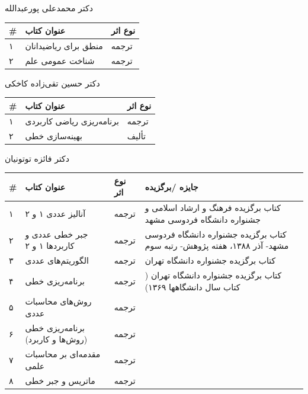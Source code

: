 \documentclass[
  letterpaper,
  DIV=11,
  numbers=noendperiod]{scrreprt}
\newcounter{none} %
\begin{document}
دکتر محمدعلی پورعبدالله

{\def\LTcaptype{none} %
\begin{longtable}[]{@{}lll@{}}
\toprule\noalign{}
\# & عنوان کتاب & نوع اثر \\
\midrule\noalign{}
\endhead
\bottomrule\noalign{}
\endlastfoot
۱ & منطق برای ریاضیدانان & ترجمه \\
۲ & شناخت عمومی علم & ترجمه \\
\end{longtable}
}

دکتر حسین تقی‌زاده کاخکی

{\def\LTcaptype{none} %
\begin{longtable}[]{@{}lll@{}}
\toprule\noalign{}
\# & عنوان کتاب & نوع اثر \\
\midrule\noalign{}
\endhead
\bottomrule\noalign{}
\endlastfoot
۱ & برنامه‌ریزی ریاضی کاربردی & ترجمه \\
۲ & بهینه‌سازی خطی & تألیف \\
\end{longtable}
}

دکتر فائزه توتونیان

{\def\LTcaptype{none} %
\begin{longtable}[]{@{}
  >{\raggedright\arraybackslash}p{}
  >{\raggedright\arraybackslash}p{}
  >{\raggedright\arraybackslash}p{}
  >{\raggedright\arraybackslash}p{}@{}}
\toprule\noalign{}
\begin{minipage}[b]{\linewidth}\raggedright
\#
\end{minipage} & \begin{minipage}[b]{\linewidth}\raggedright
عنوان کتاب
\end{minipage} & \begin{minipage}[b]{\linewidth}\raggedright
نوع اثر
\end{minipage} & \begin{minipage}[b]{\linewidth}\raggedright
جایزه /برگزیده
\end{minipage} \\
\midrule\noalign{}
\endhead
\bottomrule\noalign{}
\endlastfoot
۱ & آنالیز عددی ۱ و ۲ & ترجمه & کتاب برگزیده فرهنگ و ارشاد اسلامی و
جشنواره دانشگاه فردوسی مشهد \\
۲ & جبر خطی عددی و کاربردها ۱ و ۲ & ترجمه & کتاب برگزیده جشنواره دانشگاه
فردوسی مشهد- آذر ۱۳۸۸، هفته پژوهش- رتبه سوم \\
۳ & الگوریتم‌های عددی & ترجمه & کتاب برگزیده جشنواره دانشگاه تهران \\
۴ & برنامه‌ریزی خطی & ترجمه & کتاب برگزیده جشنواره دانشگاه تهران ( کتاب
سال دانشگاهها ۱۳۶۹) \\
۵ & روش‌های محاسبات عددی & ترجمه & \\
۶ & برنامه‌ریزی خطی (روش‌ها و کاربرد) & ترجمه & \\
۷ & مقدمه‌ای بر محاسبات علمی & ترجمه & \\
۸ & ماتریس و جبر خطی & ترجمه & \\
\end{longtable}
}
\end{document}
